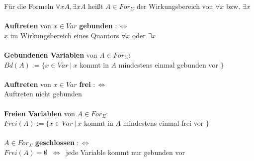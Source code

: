 \documentclass[a4paper,11pt]{scrartcl}
\newcommand{\tbf}{\textbf}
\newcommand{\Lra}{\Leftrightarrow}
\newcommand{\For}{For_\Sigma}
\theoremstyle{default}
\begin{document}
Für die Formeln $\forall x A, \exists x A$ heißt $A \in \For$ der Wirkungsbereich von $\forall x$ bzw. $\exists x$ \\
\ \\ \tbf {Auftreten} von $x \in Var$ \tbf{gebunden} $:\Lra$ \\
$x$ im Wirkungsbereich eines Quantors $\forall x$ oder $\exists x$ \\
\ \\ \tbf{Gebundenen Variablen} von $A \in \For$: \\
$Bd(A) := \{ x \in Var \ | \ x$ kommt in $A$ mindestens einmal gebunden vor $\}$ \\
\ \\ \tbf {Auftreten} von $x \in Var$ \tbf{frei} $:\Lra$ \\
Auftreten nicht gebunden \\
\ \\ \tbf{Freien Variablen} von $A \in \For$: \\
$Frei(A) := \{ x \in Var \ | \ x$ kommt in $A$ mindestens einmal frei vor $\}$ \\
\ \\ $A \in \For$ \tbf{geschlossen} $:\Lra$ \\
$Frei(A) = \emptyset$ $\ \Lra \ $ jede Variable kommt nur gebunden vor \\ 
\end{document}
